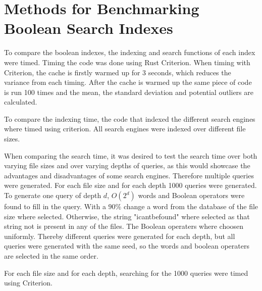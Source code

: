 \section{Methods for Benchmarking Boolean Search Indexes}
To compare the boolean indexes, the indexing and search functions of each index were timed. Timing the code was done using Rust Criterion. When timing with Criterion, the cache is firstly warmed up for 3 seconds, which reduces the variance from each timing. After the cache is warmed up the same piece of code is run 100 times and the mean, the standard deviation and potential outliers are calculated. 

To compare the indexing time, the code that indexed the different search engines where timed using criterion. All search engines were indexed over different file sizes.

When comparing the search time, it was desired to test the search time over both varying file sizes and over varying depths of queries, as this would showcase the advantages and disadvantages of some search engines. Therefore multiple queries were generated. For each file size and for each depth 1000 queries were generated. To generate one query of depth $d$, $O(2^d)$ words and Boolean operators were found to fill in the query. With a $90\%$ change a word from the database of the file size where selected. Otherwise, the string "icantbefound" where selected as that string not is present in any of the files. The Boolean operaters where choosen uniformly. Thereby different queries were generated for each depth, but all queries were generated with the same seed, so the words and boolean operaters are selected in the same order.

For each file size and for each depth, searching for the 1000 queries were timed using Criterion.